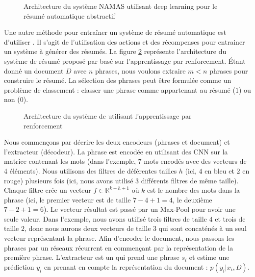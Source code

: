 \documentclass{KodeBook}
\begin{document}
\begin{figure}[!ht]
	\centering
	\caption[Architecture du système NAMAS (résumé automatique)]{Architecture du système NAMAS utilisant deep learning pour le résumé automatique abstractif \cite{15-rush-al}}
	\label{fig:ats-namas} 
\end{figure}

Une autre méthode pour entraîner un système de résumé automatique est d'utiliser . 
Il s'agit de l'utilisation des actions et des récompenses pour entrainer un système à générer des résumés.
La figure \ref{fig:ats-narayan} représente l'architecture du système de résumé proposé par \citet{18-narayan-al} basé sur l'apprentissage par renforcement.
Étant donné un document $D$ avec $n$ phrases, nous voulons extraire $m < n$ phrases pour construire le résumé. 
La sélection des phrases peut être formulée comme un problème de classement : classer une phrase comme appartenant au résumé ($1$) ou non ($0$).

\begin{figure}[!ht]
	\centering
	\caption[Architecture de résumé automatique par renforcement]{Architecture du système de \citet{18-narayan-al} utilisant l'apprentissage par renforcement}
	\label{fig:ats-narayan}
\end{figure}

Nous commençons par décrire les deux encodeurs (phrases et document) et l'extracteur (décodeur).
La phrase est encodée en utilisant des CNN sur la matrice contenant les mots (dans l'exemple, 7 mots encodés avec des vecteurs de 4 éléments). 
Nous utilisons des filtres de déférentes tailles $h$ (ici, $4$ en bleu et $2$ en rouge) plusieurs fois (ici, nous avons utilisé $3$ différents filtres de même taille). 
Chaque filtre crée un vecteur $f \in \mathbb{R}^{k-h+1}$ où $k$ est le nombre des mots dans la phrase (ici, le premier vecteur est de taille $7-4+1 = 4$, le deuxième $7-2+1 = 6$). 
Le vecteur résultat est passé par un Max-Pool pour avoir une seule valeur. 
Dans l'exemple, nous avons utilisé trois filtres de taille $4$ et trois de taille $2$, donc nous aurons deux vecteurs de  taille $3$ qui sont concaténés à un seul vecteur représentant la phrase.
Afin d'encoder le document, nous passons les phrases par un réseaux récurrent  en commençant par la représentation de la première phrase.
L'extracteur est un  qui prend une phrase $s_i$ et estime une prédiction $y_i$ en prenant en compte la représentation du document : $p(y_i|x_i, D)$.
\end{document}

